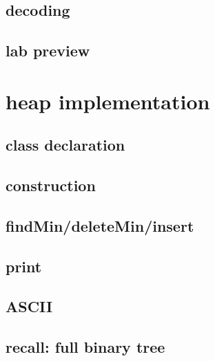 \subsection{decoding}

\subsection{lab preview}

\section{heap implementation}

\subsection{class declaration}

\subsection{construction}

\subsection{findMin/deleteMin/insert}

\subsection{print}



\subsection{ASCII}

\subsection{recall: full binary tree}



